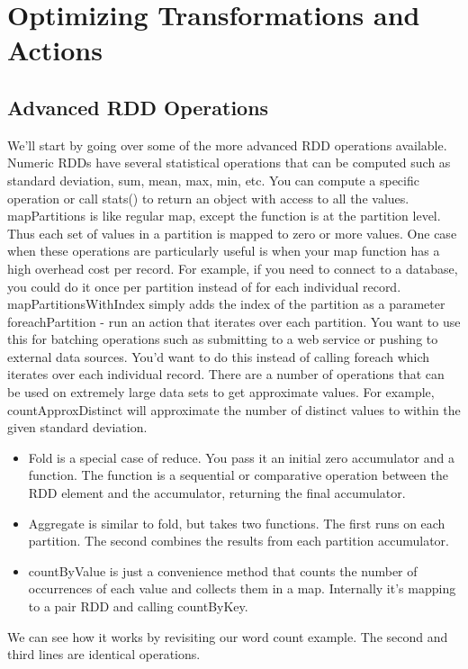 \documentclass[a4paper,12pt]{article}
\begin{document}
\section*{Optimizing Transformations and Actions}
\subsection*{Advanced RDD Operations}
We’ll start by going over some of the more advanced RDD operations available.
Numeric RDDs have several statistical operations that can be computed such as standard deviation, sum,
mean, max, min, etc. You can compute a specific operation or call stats() to return an object with access
to all the values.
mapPartitions is like regular map, except the function is at the partition level. Thus each set of values in
a partition is mapped to zero or more values. One case when these operations are particularly useful is
when your map function has a high overhead cost per record. For example, if you need to connect to a
database, you could do it once per partition instead of for each individual record.
mapPartitionsWithIndex simply adds the index of the partition as a parameter
foreachPartition - run an action that iterates over each partition. You want to use this for batching
operations such as submitting to a web service or pushing to external data sources. You’d want to do
this instead of calling foreach which iterates over each individual record.
There are a number of operations that can be used on extremely large data sets to get approximate
values. For example, countApproxDistinct will approximate the number of distinct values to within the
given standard deviation.
\begin{itemize}
\item Fold is a special case of reduce. You pass it an initial zero accumulator and a function. The function is a
sequential or comparative operation between the RDD element and the accumulator, returning the final
accumulator.
\item Aggregate is similar to fold, but takes two functions. The first runs on each partition. The second
combines the results from each partition accumulator.
\item countByValue is just a convenience method that counts the number of occurrences of each value and
collects them in a map. Internally it's mapping to a pair RDD and calling countByKey. 
\end{itemize}
We can see how it
works by revisiting our word count example. The second and third lines are identical operations.
\end{document}
